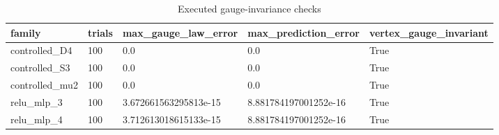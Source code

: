 \begin{table}[t]
\centering
\caption{Executed gauge-invariance checks}
\begin{tabular}{lllll}
\toprule
family & trials & max\_gauge\_law\_error & max\_prediction\_error & vertex\_gauge\_invariant \\
\midrule
controlled\_D4 & 100 & 0.0 & 0.0 & True \\
controlled\_S3 & 100 & 0.0 & 0.0 & True \\
controlled\_mu2 & 100 & 0.0 & 0.0 & True \\
relu\_mlp\_3 & 100 & 3.672661563295813e-15 & 8.881784197001252e-16 & True \\
relu\_mlp\_4 & 100 & 3.712613018615133e-15 & 8.881784197001252e-16 & True \\
\bottomrule
\end{tabular}
\end{table}

